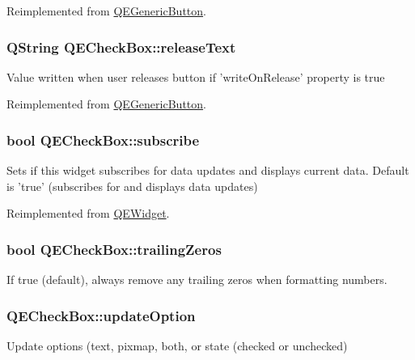 Reimplemented from \hyperlink{classQEGenericButton}{QEGenericButton}.

\hypertarget{classQECheckBox_a2fd7458304d7628495fa0e6d8ef06d15}{
\subsubsection[{releaseText}]{\setlength{\rightskip}{0pt plus 5cm}QString QECheckBox::releaseText}}
\label{classQECheckBox_a2fd7458304d7628495fa0e6d8ef06d15}
Value written when user releases button if 'writeOnRelease' property is true 

Reimplemented from \hyperlink{classQEGenericButton}{QEGenericButton}.

\hypertarget{classQECheckBox_a06582aa91f2ae059950ad0dd342e2f1b}{
\subsubsection[{subscribe}]{\setlength{\rightskip}{0pt plus 5cm}bool QECheckBox::subscribe}}
\label{classQECheckBox_a06582aa91f2ae059950ad0dd342e2f1b}
Sets if this widget subscribes for data updates and displays current data. Default is 'true' (subscribes for and displays data updates) 

Reimplemented from \hyperlink{classQEWidget}{QEWidget}.

\hypertarget{classQECheckBox_a49cdbc59074b1c5baeeddcd75a60cef1}{
\subsubsection[{trailingZeros}]{\setlength{\rightskip}{0pt plus 5cm}bool QECheckBox::trailingZeros}}
\label{classQECheckBox_a49cdbc59074b1c5baeeddcd75a60cef1}
If true (default), always remove any trailing zeros when formatting numbers. \hypertarget{classQECheckBox_a538be95fcea8bb39b021906ea3147b1b}{
\subsubsection[{updateOption}]{ QECheckBox::updateOption}}
\label{classQECheckBox_a538be95fcea8bb39b021906ea3147b1b}
Update options (text, pixmap, both, or state (checked or unchecked) 

